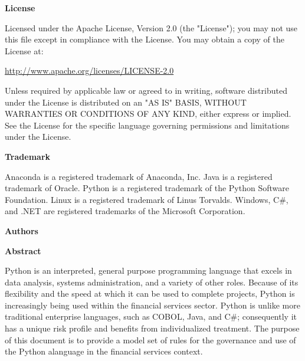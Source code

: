 \thispagestyle{empty}

\COPYRIGHT

\textbf{License}

Licensed under the Apache License, Version 2.0 (the "License"); you may not use this file except in compliance with the License. You may obtain a copy of the License at:

\url{http://www.apache.org/licenses/LICENSE-2.0}

Unless required by applicable law or agreed to in writing, software distributed under the License is distributed on an "AS IS" BASIS, WITHOUT WARRANTIES OR CONDITIONS OF ANY KIND, either express or implied. See the License for the specific language governing permissions and limitations under the License.

\textbf{Trademark}

Anaconda is a registered trademark of Anaconda, Inc. Java is a registered trademark of Oracle. Python is a registered trademark of the Python Software Foundation. Linux is a registered trademark of Linus Torvalds. Windows, C\#, and .NET are registered trademarks of the Microsoft Corporation.

\textbf{Authors}

\AUTHORS

\textbf{Abstract}

Python is an interpreted, general purpose programming language that excels in data analysis, systems administration, and a variety of other roles. Because of its flexibility and the speed at which it can be used to complete projects, Python is increasingly being used within the financial services sector. Python is unlike more traditional enterprise languages, such as COBOL, Java, and C\#; consequently it has a unique risk profile and benefits from individualized treatment. The purpose of this document is to provide a model set of rules for the governance and use of the Python alanguage in the financial services context.
